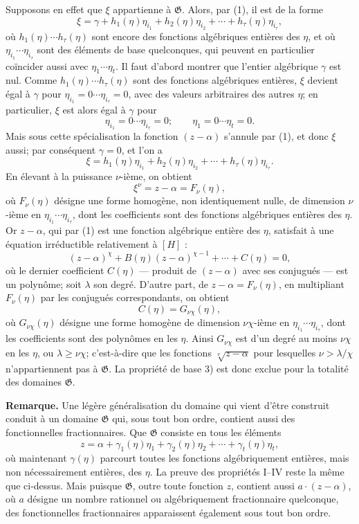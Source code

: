 Supposons en effet que $\xi$ appartienne à $\mathfrak G$. Alors, par (1), il est de la forme
\[
 \xi=\gamma+h_1(\eta)\eta_{i_1}+h_2(\eta)\eta_{i_2}
      +\cdots+h_\tau(\eta)\eta_{i_\tau},
\]
où $h_1(\eta)\cdots h_\tau(\eta)$ sont encore des fonctions algébriques entières des $\eta$, et où $\eta_{i_1}\cdots\eta_{i_\tau}$ sont des éléments de base quelconques, qui peuvent en particulier coïncider aussi avec $\eta_1\cdots\eta_t$. Il faut d'abord montrer que l'entier algébrique $\gamma$ est nul. Comme $h_1(\eta)\cdots h_\tau(\eta)$ sont des fonctions algébriques entières, $\xi$ devient égal à $\gamma$ pour $\eta_{i_1}=0\cdots\eta_{i_\tau}=0$, avec des valeurs arbitraires des autres $\eta$; en particulier, $\xi$ est alors égal à $\gamma$ pour
\[
 \eta_{i_1}=0\cdots \eta_{i_\tau}=0; \qquad
 \eta_1=0\cdots \eta_t=0.
\]
Mais sous cette spécialisation la fonction $(z-\alpha)$ s'annule par (1), et donc $\xi$ aussi; par conséquent $\gamma=0$, et l'on a
\[
 \xi=h_1(\eta)\eta_{i_1}+h_2(\eta)\eta_{i_2}
      +\cdots+h_\tau(\eta)\eta_{i_\tau}.
\]
En élevant à la puissance $\nu$-ième, on obtient
\[
 \xi^\nu=z-\alpha=F_\nu(\eta),
\]
où $F_\nu(\eta)$ désigne une forme homogène, non identiquement nulle, de dimension $\nu$-ième en $\eta_{i_1}\cdots\eta_{i_\tau}$, dont les coefficients sont des fonctions algébriques entières des $\eta$. Or $z-\alpha$, qui par (1) est une fonction algébrique entière des $\eta$, satisfait à une équation irréductible relativement à $[H]$ :
\[
 (z-\alpha)^\chi+B(\eta)(z-\alpha)^{\chi-1}+\cdots+C(\eta)=0,
\]
où le dernier coefficient $C(\eta)$ --- produit de $(z-\alpha)$ avec ses conjugués --- est un polynôme; soit $\lambda$ son degré. D'autre part, de $z-\alpha=F_\nu(\eta)$, en multipliant $F_\nu(\eta)$ par les conjugués correspondants, on obtient
\[
 C(\eta)=G_{\nu\chi}(\eta),
\]
où $G_{\nu\chi}(\eta)$ désigne une forme homogène de dimension $\nu\chi$-ième en $\eta_{i_1}\cdots\eta_{i_\tau}$, dont les coefficients sont des polynômes en les $\eta$. Ainsi $G_{\nu\chi}$ est d'un degré au moins $\nu\chi$ en les $\eta$, ou $\lambda\geq\nu\chi$; c'est-à-dire que les fonctions $\sqrt[\nu]{z-\alpha}$ pour lesquelles $\nu>\lambda/\chi$ n'appartiennent pas à $\mathfrak G$. La propriété de base 3) est donc exclue pour la totalité des domaines $\mathfrak G$.

\textbf{Remarque.} Une légère généralisation du domaine qui vient d'être construit conduit à un domaine $\mathfrak G$ qui, sous tout bon ordre, contient aussi des fonctionnelles fractionnaires. Que $\mathfrak G$ consiste en tous les éléments
\[
 z=\alpha+\gamma_1(\eta)\eta_1+\gamma_2(\eta)\eta_2
      +\cdots+\gamma_t(\eta)\eta_t,
\]
où maintenant $\gamma(\eta)$ parcourt toutes les fonctions algébriquement entières, mais non nécessairement entières, des $\eta$. La preuve des propriétés I--IV reste la même que ci-dessus. Mais puisque $\mathfrak G$, outre toute fonction $z$, contient aussi $a\cdot(z-\alpha)$, où $a$ désigne un nombre rationnel ou algébriquement fractionnaire quelconque, des fonctionnelles fractionnaires apparaissent également sous tout bon ordre.

